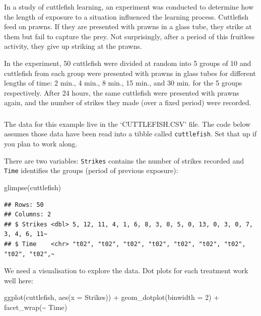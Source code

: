 \documentclass[
]{book}
\newenvironment{Shaded}{\begin{snugshade}}{\end{snugshade}}
\newcommand{\AttributeTok}[1]{\textcolor[rgb]{0.77,0.63,0.00}{#1}}
\newcommand{\DecValTok}[1]{\textcolor[rgb]{0.00,0.00,0.81}{#1}}
\newcommand{\FunctionTok}[1]{\textcolor[rgb]{0.00,0.00,0.00}{#1}}
\newcommand{\NormalTok}[1]{#1}
\newcommand{\SpecialCharTok}[1]{\textcolor[rgb]{0.00,0.00,0.00}{#1}}
\newenvironment{greybox}{
  \definecolor{shadecolor}{rgb}{0.95,0.95,0.95}  %
  \color{black}
  \begin{shaded}}
 {\end{shaded}}
\newenvironment{infobox}[1]
  {
  \begin{itemize}
  \renewcommand{\labelitemi}{
    \raisebox{-.7\height}[0pt][0pt]{
      {\setkeys{Gin}{width=3em,keepaspectratio}
        \texttt{[image: images/\#1]}}
    }
  }
  \setlength{\fboxsep}{1em}
  \begin{greybox}
  \item
  }
  {
  \end{greybox}
  \end{itemize}
  }
\begin{document}
In a study of cuttlefish learning, an experiment was conducted to determine how the length of exposure to a situation influenced the learning process. Cuttlefish feed on prawns. If they are presented with prawns in a glass tube, they strike at them but fail to capture the prey. Not surprisingly, after a period of this fruitless activity, they give up striking at the prawns.

In the experiment, 50 cuttlefish were divided at random into 5 groups of 10 and cuttlefish from each group were presented with prawns in glass tubes for different lengths of time: 2 min., 4 min., 8 min., 15 min., and 30 min. for the 5 groups respectively. After 24 hours, the same cuttlefish were presented with prawns again, and the number of strikes they made (over a fixed period) were recorded.

\begin{infobox}{action}

\hypertarget{section-21}{%
\subsubsection*{}\label{section-21}}

The data for this example live in the `CUTTLEFISH.CSV' file. The code below assumes those data have been read into a tibble called \texttt{cuttlefish}. Set that up if you plan to work along.

\end{infobox}

There are two variables: \texttt{Strikes} contains the number of strikes recorded and \texttt{Time} identifies the groups (period of previous exposure):

\begin{Shaded}
\begin{Highlighting}[]
\FunctionTok{glimpse}\NormalTok{(cuttlefish)}
\end{Highlighting}
\end{Shaded}

\begin{verbatim}
## Rows: 50
## Columns: 2
## $ Strikes <dbl> 5, 12, 11, 4, 1, 6, 8, 3, 0, 5, 0, 13, 0, 3, 0, 7, 3, 4, 6, 11~
## $ Time    <chr> "t02", "t02", "t02", "t02", "t02", "t02", "t02", "t02", "t02",~
\end{verbatim}

We need a visualisation to explore the data. Dot plots for each treatment work well here:

\begin{Shaded}
\begin{Highlighting}[]
\FunctionTok{ggplot}\NormalTok{(cuttlefish, }\FunctionTok{aes}\NormalTok{(}\AttributeTok{x =}\NormalTok{ Strikes)) }\SpecialCharTok{+} 
  \FunctionTok{geom\_dotplot}\NormalTok{(}\AttributeTok{binwidth =} \DecValTok{2}\NormalTok{) }\SpecialCharTok{+} \FunctionTok{facet\_wrap}\NormalTok{(}\SpecialCharTok{\textasciitilde{}}\NormalTok{ Time)}
\end{Highlighting}
\end{Shaded}
\end{document}
